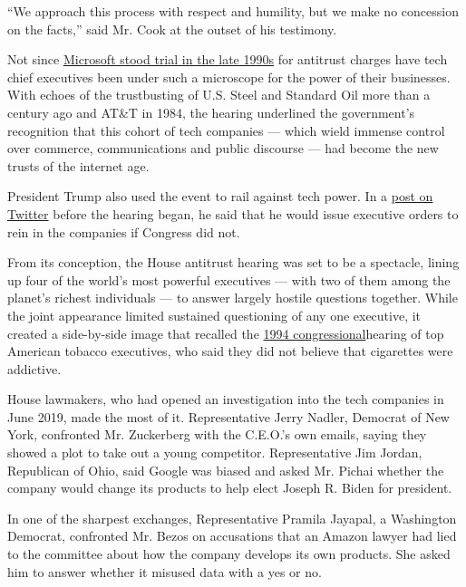 ``We approach this process with respect and humility, but we make no
concession on the facts,'' said Mr. Cook at the outset of his testimony.

Not since
\href{https://www.nytimes3xbfgragh.onion/1999/02/27/business/microsoft-rests-its-case-ending-on-a-misstep.html}{Microsoft
stood trial in the late 1990s} for antitrust charges have tech chief
executives been under such a microscope for the power of their
businesses. With echoes of the trustbusting of U.S. Steel and Standard
Oil more than a century ago and AT\&T in 1984, the hearing underlined
the government's recognition that this cohort of tech companies ---
which wield immense control over commerce, communications and public
discourse --- had become the new trusts of the internet age.

President Trump also used the event to rail against tech power. In a
\href{https://twitter.com/realDonaldTrump/status/1288506554585505793}{post
on Twitter} before the hearing began, he said that he would issue
executive orders to rein in the companies if Congress did not.

From its conception, the House antitrust hearing was set to be a
spectacle, lining up four of the world's most powerful executives ---
with two of them among the planet's richest individuals --- to answer
largely hostile questions together. While the joint appearance limited
sustained questioning of any one executive, it created a side-by-side
image that recalled the
\href{https://www.nytimes3xbfgragh.onion/1994/04/15/us/tobacco-chiefs-say-cigarettes-aren-t-addictive.html}{1994
congressional}hearing of top American tobacco executives, who said they
did not believe that cigarettes were addictive.

House lawmakers, who had opened an investigation into the tech companies
in June 2019, made the most of it. Representative Jerry Nadler, Democrat
of New York, confronted Mr. Zuckerberg with the C.E.O.'s own emails,
saying they showed a plot to take out a young competitor. Representative
Jim Jordan, Republican of Ohio, said Google was biased and asked Mr.
Pichai whether the company would change its products to help elect
Joseph R. Biden for president.

In one of the sharpest exchanges, Representative Pramila Jayapal, a
Washington Democrat, confronted Mr. Bezos on accusations that an Amazon
lawyer had lied to the committee about how the company develops its own
products. She asked him to answer whether it misused data with a yes or
no.

